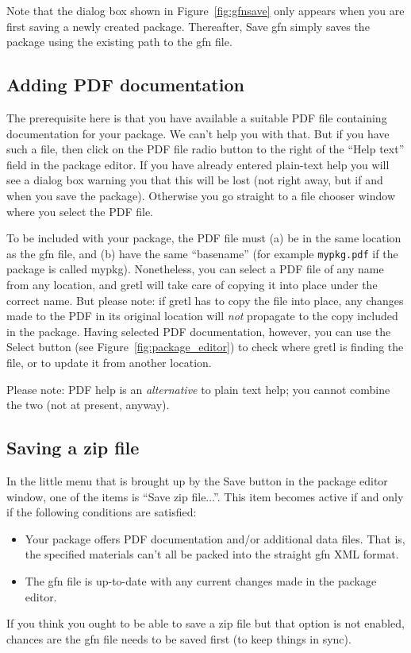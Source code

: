 \documentclass[oneside]{book}
\begin{document}
Note that the dialog box shown in Figure~\ref{fig:gfnsave} only
appears when you are first saving a newly created package. Thereafter,
\textsf{Save gfn} simply saves the package using the existing path to
the \textsf{gfn} file.

\subsection{Adding PDF documentation}
\label{sec:gui-pdf}

The prerequisite here is that you have available a suitable PDF file
containing documentation for your package. We can't help you with
that. But if you have such a file, then click on the \textsf{PDF file}
radio button to the right of the ``Help text'' field in the package
editor. If you have already entered plain-text help you will see a
dialog box warning you that this will be lost (not right away, but if
and when you save the package). Otherwise you go straight to a file
chooser window where you select the PDF file.

To be included with your package, the PDF file must (a) be in the same
location as the \textsf{gfn} file, and (b) have the same ``basename''
(for example \texttt{mypkg.pdf} if the package is called
\textsf{mypkg}). Nonetheless, you can select a PDF file of any name
from any location, and gretl will take care of copying it into place
under the correct name. But please note: if gretl has to copy the file
into place, any changes made to the PDF in its original location will
\textit{not} propagate to the copy included in the package. Having
selected PDF documentation, however, you can use the \textsf{Select}
button (see Figure~\ref{fig:package_editor}) to check where gretl is
finding the file, or to update it from another location.

Please note: PDF help is an \textit{alternative} to plain text
help; you cannot combine the two (not at present, anyway).

\subsection{Saving a zip file}
\label{sec:save-zip}

In the little menu that is brought up by the \textsf{Save} button in
the package editor window, one of the items is ``Save zip file...''.
This item becomes active if and only if the following conditions are
satisfied:
\begin{itemize}
\item Your package offers PDF documentation and/or additional data
  files. That is, the specified materials can't all be packed into the
  straight \textsf{gfn} XML format.
\item The \textsf{gfn} file is up-to-date with any current changes
  made in the package editor.
\end{itemize}
If you think you ought to be able to save a zip file but that option
is not enabled, chances are the \textsf{gfn} file needs to be saved
first (to keep things in sync).
\end{document}
